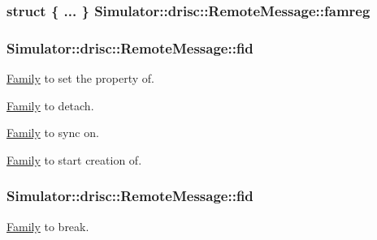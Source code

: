 \hypertarget{struct_simulator_1_1drisc_1_1_remote_message_aa2636de44b434fcb73e66afe20b95162}{
\subsubsection[{famreg}]{\setlength{\rightskip}{0pt plus 5cm}struct \{ ... \}   Simulator\+::drisc\+::\+Remote\+Message\+::famreg}}\label{struct_simulator_1_1drisc_1_1_remote_message_aa2636de44b434fcb73e66afe20b95162}
\hypertarget{struct_simulator_1_1drisc_1_1_remote_message_ab2c43fd4c7a851a6802ffe2d090b3f8c}{
\subsubsection[{fid}]{ Simulator\+::drisc\+::\+Remote\+Message\+::fid}}\label{struct_simulator_1_1drisc_1_1_remote_message_ab2c43fd4c7a851a6802ffe2d090b3f8c}


\hyperlink{struct_simulator_1_1drisc_1_1_family}{Family} to set the property of. 

\hyperlink{struct_simulator_1_1drisc_1_1_family}{Family} to detach.

\hyperlink{struct_simulator_1_1drisc_1_1_family}{Family} to sync on.

\hyperlink{struct_simulator_1_1drisc_1_1_family}{Family} to start creation of. \hypertarget{struct_simulator_1_1drisc_1_1_remote_message_a5cbdd7d5433c9e926eb4c24d480deb9e}{
\subsubsection[{fid}]{ Simulator\+::drisc\+::\+Remote\+Message\+::fid}}\label{struct_simulator_1_1drisc_1_1_remote_message_a5cbdd7d5433c9e926eb4c24d480deb9e}


\hyperlink{struct_simulator_1_1drisc_1_1_family}{Family} to break. 

